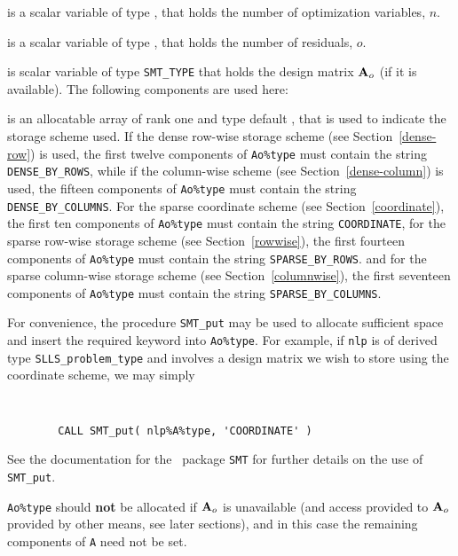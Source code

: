 \documentclass{galahad}
\newcommand{\packagename}{SLLS}
\begin{document}
\begin{description}

 is a scalar variable of type \integer,
 that holds the number of optimization variables, $n$.

 is a scalar variable of type \integer,
 that holds the number of residuals, $o$.

 is scalar variable of type {\tt SMT\_TYPE}
that holds the design matrix ${\mathbf{A}}_o$ (if it is available).
The following components are used here:

\begin{description}

 is an allocatable array of rank one and type default
\character, that
is used to indicate the storage scheme used. If the dense row-wise
storage scheme (see Section~\ref{dense-row}) is used,
the first twelve components of {\tt Ao\%type} must contain the
string {\tt DENSE\_BY\_ROWS}, while if the column-wise scheme
(see Section~\ref{dense-column}) is used,
the fifteen components of {\tt Ao\%type} must contain the
string {\tt DENSE\_BY\_COLUMNS}.
For the sparse coordinate scheme (see Section~\ref{coordinate}),
the first ten components of {\tt Ao\%type} must contain the
string {\tt COORDINATE},
for the sparse row-wise storage scheme (see Section~\ref{rowwise}),
the first fourteen components of {\tt Ao\%type} must contain the
string {\tt SPARSE\_BY\_ROWS}.
and for the sparse column-wise storage scheme (see Section~\ref{columnwise}),
the first seventeen components of {\tt Ao\%type} must contain the
string {\tt SPARSE\_BY\_COLUMNS}.

For convenience, the procedure {\tt SMT\_put}
may be used to allocate sufficient space and insert the required keyword
into {\tt Ao\%type}.
For example, if {\tt nlp} is of derived type {\tt \packagename\_problem\_type}
and involves a design matrix we wish to store using the coordinate scheme,
we may simply
{\tt
\begin{verbatim}
        CALL SMT_put( nlp%A%type, 'COORDINATE' )
\end{verbatim}
}
\noindent
See the documentation for the \galahad\ package {\tt SMT}
for further details on the use of {\tt SMT\_put}.

\noindent
{\tt Ao\%type} should {\bf not} be allocated if ${\mathbf{A}}_o$ is unavailable
(and access provided to  ${\mathbf{A}}_o$ provided by other means, see later sections), 
and in this case the remaining components of {\tt A} need not be set.


\end{description}
\end{description}
\end{document}
